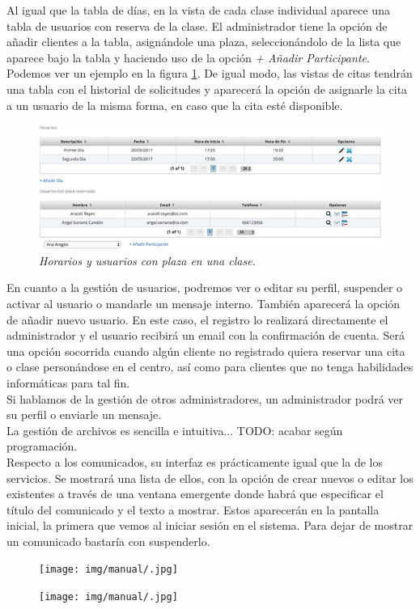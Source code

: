 Al igual que la tabla de días, en la vista de cada clase individual aparece una tabla de usuarios con reserva de la clase. El administrador tiene la opción de añadir clientes a la tabla, asignándole una plaza, seleccionándolo de la lista que aparece bajo la tabla y haciendo uso de la opción \textit{+ Añadir Participante}. Podemos ver un ejemplo en la figura \ref{fig:horarios-y-usuarios-clase}. De igual modo, las vistas de citas tendrán una tabla con el historial de solicitudes y aparecerá la opción de asignarle la cita a un usuario de la misma forma, en caso que la cita esté disponible. \\

\begin{figure}
\centering
  \includegraphics[scale=.60]{img/manual/horarios-y-usuarios-clase.jpg}
  \caption{\textit{Horarios y usuarios con plaza en una clase.}}
  \label{fig:horarios-y-usuarios-clase}
\end{figure}

En cuanto a la gestión de usuarios, podremos ver o editar su perfil, suspender o activar al usuario o mandarle un mensaje interno. También aparecerá la opción de añadir nuevo usuario. En este caso, el registro lo realizará directamente el administrador y el usuario recibirá un email con la confirmación de cuenta. Será una opción socorrida cuando algún cliente no registrado quiera reservar una cita o clase personándose en el centro, así como para clientes que no tenga habilidades informáticas para tal fin. \\ 

Si hablamos de la gestión de otros administradores, un administrador podrá ver su perfil o enviarle un mensaje. \\

La gestión de archivos es sencilla e intuitiva... TODO: acabar según programación. \\

Respecto a los comunicados, su interfaz es prácticamente igual que la de los servicios. Se mostrará una lista de ellos, con la opción de crear nuevos o editar los existentes a través de una ventana emergente donde habrá que especificar el título del comunicado y el texto a mostrar. Estos aparecerán en la pantalla inicial, la primera que vemos al iniciar sesión en el sistema. Para dejar de mostrar un comunicado bastaría con suspenderlo. \\





\begin{figure}
\centering
  \texttt{[image: img/manual/.jpg]}
  \caption{\textit{}}
  \label{fig:}
\end{figure}


\begin{figure}
\centering
  \texttt{[image: img/manual/.jpg]}
  \caption{\textit{}}
  \label{fig:}
\end{figure}






